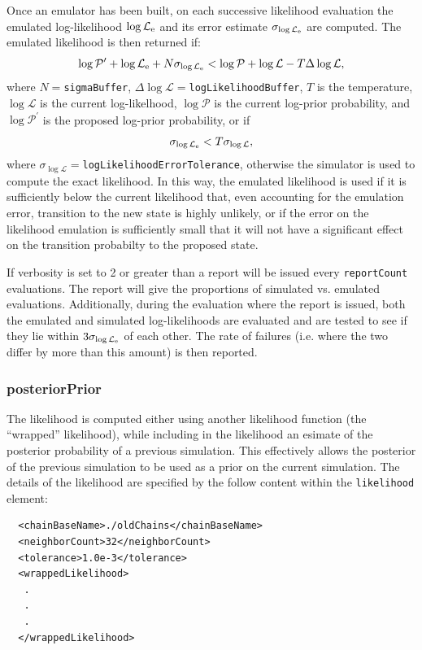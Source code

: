 Once an emulator has been built, on each successive likelihood evaluation the emulated log-likelihood $\log\mathcal{L}_{\rm e}$ and its error estimate $\sigma_{\log\mathcal{L}_{\rm e}}$ are computed. The emulated likelihood is then returned if:
\begin{equation}
\log\mathcal{P}^\prime + \log\mathcal{L}_{\rm e} + N \sigma_{\log\mathcal{L}_{\rm e}} < \log\mathcal{P} + \log\mathcal{L} - T \Delta\log\mathcal{L},
\end{equation}
where $N=${\tt sigmaBuffer}, $\Delta\log\mathcal{L}=${\tt logLikelihoodBuffer}, $T$ is the temperature, $\log\mathcal{L}$ is the current log-likelhood, $\log\mathcal{P}$ is the current log-prior probability, and $\log\mathcal{P}^\prime$ is the proposed log-prior probability, or if
\begin{equation}
\sigma_{\log\mathcal{L}_{\rm e}} < T \sigma_{\log\mathcal{L}},
\end{equation}
where $\sigma_{\log\mathcal{L}}=${\tt logLikelihoodErrorTolerance}, otherwise the simulator is used to compute the exact likelihood. In this way, the emulated likelihood is used if it is sufficiently below the current likelihood that, even accounting for the emulation error, transition to the new state is highly unlikely, or if the error on the likelihood emulation is sufficiently small that it will not have a significant effect on the transition probabilty to the proposed state.

If verbosity is set to 2 or greater than a report will be issued every {\tt reportCount} evaluations. The report will give the proportions of simulated vs. emulated evaluations. Additionally, during the evaluation where the report is issued, both the emulated and simulated log-likelihoods are evaluated and are tested to see if they lie within $3 \sigma_{\log\mathcal{L}_{\rm e}}$ of each other. The rate of failures (i.e. where the two differ by more than this amount) is then reported.

\subsubsection{posteriorPrior}

The likelihood is computed either using another likelihood function (the ``wrapped'' likelihood), while including in the likelihood an esimate of the posterior probability of a previous simulation. This effectively allows the posterior of the previous simulation to be used as a prior on the current simulation. The details of the likelihood are specified by the follow content within the {\tt likelihood} element:
\begin{verbatim}
  <chainBaseName>./oldChains</chainBaseName>
  <neighborCount>32</neighborCount>
  <tolerance>1.0e-3</tolerance>
  <wrappedLikelihood>
   .
   .
   .
  </wrappedLikelihood>
\end{verbatim}

